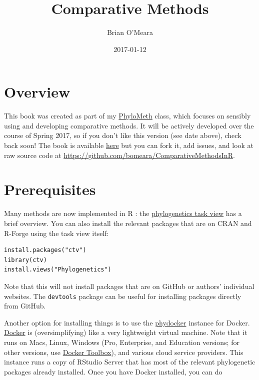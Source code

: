\documentclass[]{book}
\title{Comparative Methods}
\author{Brian O'Meara}
\date{2017-01-12}
\theoremstyle{definition}
\theoremstyle{definition}
\theoremstyle{remark}
\begin{document}
\maketitle

{
\setcounter{tocdepth}{1}
\tableofcontents
}
\section{Overview}\label{overview}

This book was created as part of my
\href{http://www.phylometh.org}{PhyloMeth} class, which focuses on
sensibly using and developing comparative methods. It will be actively
developed over the course of Spring 2017, so if you don't like this
version (see date above), check back soon! The book is available
\href{https://bookdown.org/bomeara/comparative-methods/}{here} but you
can fork it, add issues, and look at raw source code at
\url{https://github.com/bomeara/ComparativeMethodsInR}.

\section{Prerequisites}\label{prerequisites}

Many methods are now implemented in R \citep{R-base}: the
\href{http://cran.r-project.org/web/views/Phylogenetics.html}{phylogenetics
task view} has a brief overview. You can also install the relevant
packages that are on CRAN and R-Forge using the task view itself:

\begin{verbatim}
install.packages("ctv")
library(ctv)
install.views("Phylogenetics")
\end{verbatim}

Note that this will not install packages that are on GitHub or authors'
individual websites. The \texttt{devtools} package can be useful for
installing packages directly from GitHub.

Another option for installing things is to use the
\href{https://hub.docker.com/r/bomeara/phydocker/}{phydocker} instance
for Docker. \href{https://www.docker.com}{Docker} is (oversimplifying)
like a very lightweight virtual machine. Note that it runs on Macs,
Linux, Windows (Pro, Enterprise, and Education versions; for other
versions, use
\href{https://docs.docker.com/toolbox/toolbox_install_windows/}{Docker
Toolbox}), and various cloud service providers. This instance runs a
copy of RStudio Server that has most of the relevant phylogenetic
packages already installed. Once you have Docker installed, you can do
\end{document}
